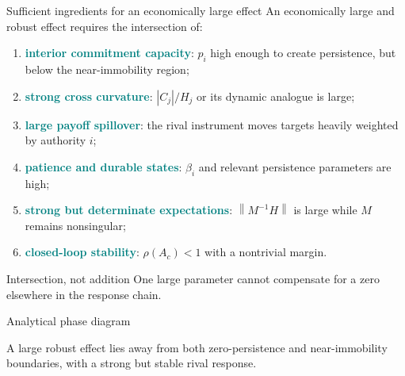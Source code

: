 \documentclass[10pt,aspectratio=169]{beamer}
\newcommand{\key}[1]{\textcolor{teal}{\textbf{#1}}}
\newcommand{\norm}[1]{\left\lVert#1\right\rVert}
\begin{document}
\begin{frame}{Sufficient ingredients for an economically large effect}
An economically large and robust effect requires the intersection of:
\begin{enumerate}
  \item \key{interior commitment capacity}: $p_i$ high enough to create
        persistence, but below the near-immobility region;
  \item \key{strong cross curvature}: $|C_j|/H_j$ or its dynamic analogue is
        large;
  \item \key{large payoff spillover}: the rival instrument moves targets heavily
        weighted by authority $i$;
  \item \key{patience and durable states}: $\beta_i$ and relevant persistence
        parameters are high;
  \item \key{strong but determinate expectations}: $\norm{M^{-1}H}$ is large
        while $M$ remains nonsingular;
  \item \key{closed-loop stability}: $\rho(A_c)<1$ with a nontrivial margin.
\end{enumerate}
\begin{alertblock}{Intersection, not addition}
One large parameter cannot compensate for a zero elsewhere in the response
chain.
\end{alertblock}
\end{frame}

\begin{frame}{Analytical phase diagram}
\centering
{}
\vfill
\centering A large robust effect lies away from both zero-persistence and
near-immobility boundaries, with a strong but stable rival response.
\end{frame}
\end{document}
